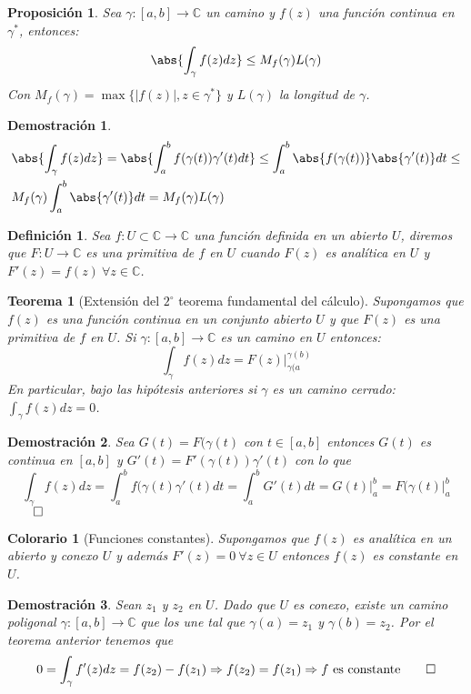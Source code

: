 \documentclass[12pt]{book}
\newtheorem{defi}{Definición}[chapter]
\newtheorem{theorem}{Teorema}[chapter]
\newtheorem{prop}{Proposición}[chapter]
\newtheorem*{dem}{Demostración}
\newtheorem{col}{Colorario}[chapter]
\newcommand{\C}{\mathbb{C}}
\newcommand{\f}{f: U\subset \C \longrightarrow \C}
\begin{document}
\begin{prop}
Sea $\gamma:[a,b]\longrightarrow \C$ un camino y $f(z)$ una función continua en $\gamma^*$, entonces:
$$\abs{\int_\gamma f(z)dz }\leq M_f(\gamma)L(\gamma)$$
Con $M_f(\gamma) = \max \{|f(z)|,z \in \gamma^* \}$ y $L(\gamma)$ la longitud de $\gamma$.
\end{prop}

\begin{dem}
	\begin{align*}
		&\abs{\int_\gamma f(z)dz } = \abs{\int_a^b f(\gamma(t))\gamma'(t)dt}\leq \int_a^b \abs{f(\gamma(t))}\abs{\gamma'(t)}dt\leq\\
		&M_f(\gamma)\int_a^b\abs{\gamma'(t)}dt =  M_f(\gamma)L(\gamma)
	\end{align*}
\end{dem}

\begin{defi}
Sea $\f$ una función definida en un abierto $U$, diremos que $F: U \longrightarrow\C$ es una primitiva de $f$ en $U$ cuando $F(z)$ es analítica en $U$ y $F'(z) = f(z) \ \forall z \in\C$.
\end{defi}

\begin{theorem}[Extensión del $2^\circ$ teorema fundamental del cálculo]
Supongamos que $f(z)$ es una función continua en un conjunto abierto $U$ y que $F(z)$ es una primitiva de $f$ en $U$. Si $\gamma:[a,b]\longrightarrow \C$ es un camino en $U$ entonces:
$$\int_\gamma f(z)dz = F(z)\bigg|_{\gamma(a}^{\gamma(b)}$$
En particular, bajo las hipótesis anteriores si $\gamma$ es un camino cerrado: $\int_\gamma f(z)dz = 0$.
\end{theorem}

\begin{dem}
Sea $G(t) = F(\gamma(t)$ con $t\in [a,b]$ entonces $G(t)$ es continua en $[a,b]$ y $G'(t) = F'(\gamma(t))\gamma'(t)$ con lo que
$$\int_\gamma f(z)dz = \int_a^b f(\gamma(t)\gamma'(t)dt = \int_a^b G'(t)dt = G(t)\bigg|_a^b = F(\gamma(t)\bigg |_a^b $$ $\qed$
\end{dem}

\begin{col}[Funciones constantes]
Supongamos que $f(z)$ es analítica en un abierto y conexo $U$ y además $F'(z)=0 \ \forall z \in U$ entonces $f(z)$ es constante en $U$.
\end{col}

\begin{dem}
Sean $z_1$ y $z_2$ en $U$. Dado que $U$ es conexo, existe un camino poligonal $\gamma:[a,b] \longrightarrow \C$ que los une tal que $\gamma(a) = z_1$ y $\gamma(b) = z_2$. Por el teorema anterior tenemos que
$$0 = \int_{\gamma} f'(z)dz = f(z_2)-f(z_1) \Rightarrow f(z_2)=f(z_1) \Rightarrow f \text{ es constante} \qed$$
\end{dem}
\end{document}
